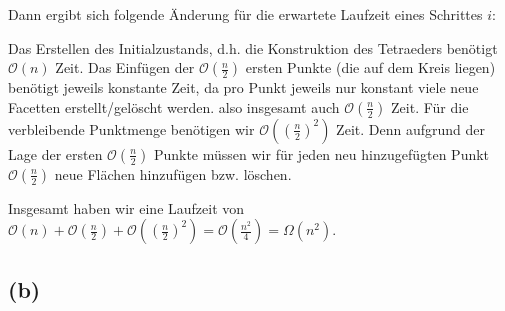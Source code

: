 \documentclass[a4paper]{article}
\begin{document}
Dann ergibt sich folgende Änderung für die erwartete Laufzeit eines Schrittes $i$:

Das Erstellen des Initialzustands, d.h. die Konstruktion des Tetraeders benötigt $\mathcal{O}(n)$ Zeit.
Das Einfügen der $\mathcal{O}(\frac{n}{2})$ ersten Punkte (die auf dem Kreis liegen) benötigt jeweils konstante Zeit,
da pro Punkt jeweils nur konstant viele neue Facetten erstellt/gelöscht werden. also insgesamt auch $\mathcal{O}(\frac{n}{2})$ Zeit.
Für die verbleibende Punktmenge benötigen wir $\mathcal{O}((\frac{n}{2})^2)$ Zeit. Denn aufgrund der Lage der ersten $\mathcal{O}(\frac{n}{2})$ Punkte
müssen wir für jeden neu hinzugefügten Punkt  $\mathcal{O}(\frac{n}{2})$ neue Flächen hinzufügen bzw. löschen. 

Insgesamt haben wir eine Laufzeit von  $\mathcal{O}(n) + \mathcal{O}(\frac{n}{2}) + \mathcal{O}((\frac{n}{2})^2) = \mathcal{O}(\frac{n^2}{4}) = \Omega(n^2) $.


\subsection*{(b)}

  
\end{document}

